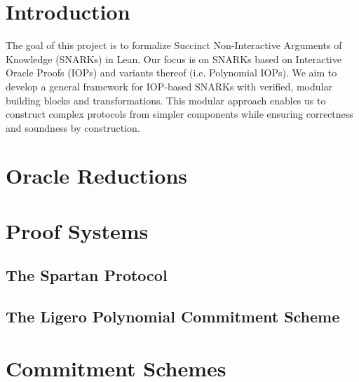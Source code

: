 \chapter{Introduction}

The goal of this project is to formalize Succinct Non-Interactive Arguments of Knowledge (SNARKs) in
Lean. Our focus is on SNARKs based on Interactive Oracle Proofs (IOPs) and variants thereof (i.e.
Polynomial IOPs). We aim to develop a general framework for IOP-based SNARKs with verified, modular
building blocks and transformations. This modular approach enables us to construct complex protocols
from simpler components while ensuring correctness and soundness by construction.

\chapter{Oracle Reductions}\label{chap:oracle_reductions}







\chapter{Proof Systems}\label{chap:proof_systems}















\section{The Spartan Protocol}

\section{The Ligero Polynomial Commitment Scheme}

\chapter{Commitment Schemes}\label{chap:commitment_schemes}

